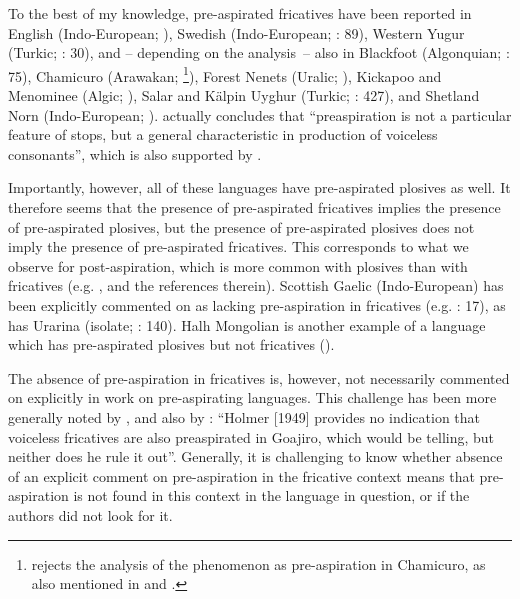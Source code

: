 \documentclass[output=paper]{langscibook}
\begin{document}
To the best of my knowledge, pre-aspirated fricatives have been reported in English (Indo-European; \citealt{HejnáEtAl2021}), Swedish (Indo-European; \citealt{Helgason2002}: 89), Western Yugur (Turkic; \citealt{Roos1998}: 30), and – depending on the analysis~– also in Blackfoot (Algonquian; \citealt{Windsor2016}: 75), Chamicuro (Arawakan; \citealt{Silverman2003}\footnote{\citet[61]{Clayton2010} rejects the analysis of the phenomenon as pre\hyp aspiration in Chamicuro, as also mentioned in  and .}), Forest Nenets (Uralic; \citealt{Salminen2007}), Kickapoo and Menominee (Algic; \citealt{Gathercole1983}), Salar and Kälpin Uyghur (Turkic; \citealt{Dwyer2000}: 427), and Shetland Norn (Indo-European; \citealt{Knooihuizen2013}). \citet[89]{Helgason2002} actually concludes that “preaspiration is not a particular feature of stops, but a general characteristic in production of voiceless consonants”, which is also supported by \citet[9]{Clayton2010}.

Importantly, however, all of these languages have pre-aspirated plosives as well. It therefore seems that the presence of pre-aspirated fricatives implies the presence of pre-aspirated plosives, but the presence of pre-aspirated plosives does not imply the presence of pre-aspirated fricatives. This corresponds to what we observe for post-aspiration, which is more common with plosives than with fricatives (e.g. \citealt{Jacques2011}, and the references therein). Scottish Gaelic (Indo{}-European) has been explicitly commented on as lacking pre\hyp aspiration in fricatives (e.g. \citealt{Clayton2010}: 17), as has Urarina (isolate; \citealt{Elias-UlloaAramburú2021}: 140). Halh Mongolian is another example of a language which has pre-aspirated plosives but not fricatives (\citealt{JatteauHejná2018}).

The absence of pre\hyp aspiration in fricatives is, however, not necessarily commented on explicitly in work on pre-aspirating languages. This challenge has been more generally noted by \citet[577]{Silverman2003}, and also by \citet[17]{Clayton2010}: “Holmer [1949] provides no indication that voiceless fricatives are also preaspirated in Goajiro, which would be telling, but neither does he rule it out”. Generally, it is challenging to know whether absence of an explicit comment on pre\hyp aspiration in the fricative context means that pre\hyp aspiration is not found in this context in the language in question, or if the authors did not look for it.
\end{document}
